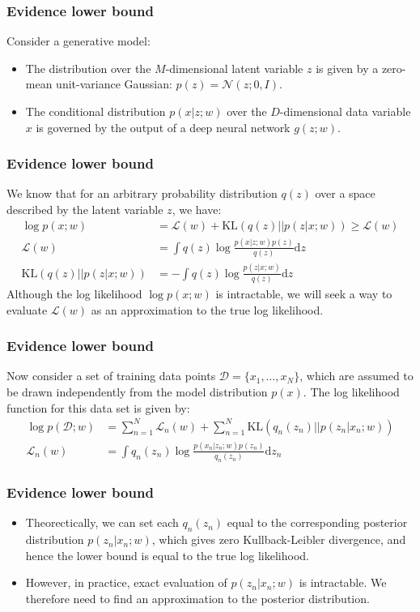 \documentclass{beamer}
\begin{document}
\begin{frame}
    \frametitle{Evidence lower bound}
    Consider a generative model:
    \begin{itemize}
        \item The distribution over the $M$-dimensional latent variable $z$ is given by a zero-mean unit-variance Gaussian: $p(z)=\mathcal{N}(z;0,I)$.
        \item The conditional distribution $p(x|z;w)$ over the $D$-dimensional data variable $x$ is governed by the output of a deep neural network $g(z;w)$.
    \end{itemize}
\end{frame}

\begin{frame}
    \frametitle{Evidence lower bound}
    We know that for an arbitrary probability distribution $q(z)$ over a space described by the latent variable $z$, we have:
    \begin{align*}
        \log{}p(x;w)&=\mathcal{L}(w)+\mathrm{KL}(q(z)||p(z|x;w))\ge\mathcal{L}(w) \\
        \mathcal{L}(w)&=\int{}q(z)\log\frac{p(x|z;w)p(z)}{q(z)}\mathrm{d}z \\
        \mathrm{KL}(q(z)||p(z|x;w))&=-\int{}q(z)\log\frac{p(z|x;w)}{q(z)}\mathrm{d}z
    \end{align*}
    Although the log likelihood $\log{}p(x;w)$ is intractable, we will seek a way to evaluate $\mathcal{L}(w)$ as an approximation to the true log likelihood.
\end{frame}

\begin{frame}
    \frametitle{Evidence lower bound}
    Now consider a set of training data points $\mathcal{D}=\{x_{1},\hdots,x_{N}\}$, which are assumed to be drawn independently from the model distribution $p(x)$. The log likelihood function for this data set is given by:
    \begin{align*}
        \log{}p(\mathcal{D};w)&=\sum_{n=1}^{N}\mathcal{L}_{n}(w)+\sum_{n=1}^{N}\mathrm{KL}(q_{n}(z_{n})||p(z_{n}|x_{n};w)) \\
        \mathcal{L}_{n}(w)&=\int{}q_{n}(z_{n})\log\frac{p(x_{n}|z_{n};w)p(z_{n})}{q_{n}(z_{n})}\mathrm{d}z_{n}
    \end{align*}
\end{frame}

\begin{frame}
    \frametitle{Evidence lower bound}
    \begin{itemize}
        \item Theorectically, we can set each $q_{n}(z_{n})$ equal to the corresponding posterior distribution $p(z_{n}|x_{n};w)$, which gives zero Kullback-Leibler divergence, and hence the lower bound is equal to the true log likelihood.
        \item However, in practice, exact evaluation of $p(z_{n}|x_{n};w)$ is intractable. We therefore need to find an approximation to the posterior distribution.
    \end{itemize}
\end{frame}
\end{document}
